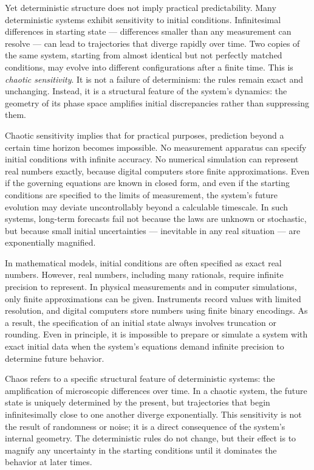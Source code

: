 Yet deterministic structure does not imply practical predictability. Many deterministic systems exhibit sensitivity to initial conditions. Infinitesimal differences in starting state — differences smaller than any measurement can resolve — can lead to trajectories that diverge rapidly over time. Two copies of the same system, starting from almost identical but not perfectly matched conditions, may evolve into different configurations after a finite time. This is \emph{chaotic sensitivity}. It is not a failure of determinism: the rules remain exact and unchanging. Instead, it is a structural feature of the system's dynamics: the geometry of its phase space amplifies initial discrepancies rather than suppressing them.

Chaotic sensitivity implies that for practical purposes, prediction beyond a certain time horizon becomes impossible. No measurement apparatus can specify initial conditions with infinite accuracy. No numerical simulation can represent real numbers exactly, because digital computers store finite approximations. Even if the governing equations are known in closed form, and even if the starting conditions are specified to the limits of measurement, the system’s future evolution may deviate uncontrollably beyond a calculable timescale. In such systems, long-term forecasts fail not because the laws are unknown or stochastic, but because small initial uncertainties — inevitable in any real situation — are exponentially magnified.

In mathematical models, initial conditions are often specified as exact real numbers. However, real numbers, including many rationals, require infinite precision to represent. In physical measurements and in computer simulations, only finite approximations can be given. Instruments record values with limited resolution, and digital computers store numbers using finite binary encodings. As a result, the specification of an initial state always involves truncation or rounding. Even in principle, it is impossible to prepare or simulate a system with exact initial data when the system's equations demand infinite precision to determine future behavior.

Chaos refers to a specific structural feature of deterministic systems: the amplification of microscopic differences over time. In a chaotic system, the future state is uniquely determined by the present, but trajectories that begin infinitesimally close to one another diverge exponentially. This sensitivity is not the result of randomness or noise; it is a direct consequence of the system’s internal geometry. The deterministic rules do not change, but their effect is to magnify any uncertainty in the starting conditions until it dominates the behavior at later times.

